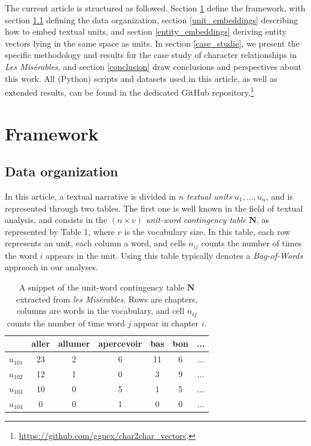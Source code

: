 \documentclass[
twocolumn,
]{ceurart}
\begin{document}
The current article is structured as followed. Section \ref{methodology} define the framework, with section \ref{data} defining the data organization, section  \ref{unit_embeddings} describing how to embed textual units, and section \ref{entity_embeddings} deriving entity vectors lying in the same space as units. In section \ref{case_studie}, we present the specific methodology and results for the case study of character relationships in \emph{Les Misérables}, and section \ref{conclusion} draw conclusions and perspectives about this work. All (Python) scripts and datasets used in this article, as well as extended results, can be found in the dedicated GitHub repository.\footnote{\url{https://github.com/gguex/char2char_vectors}.}

\section{Framework}
\label{methodology}

\subsection{Data organization}
\label{data}

In this article, a textual narrative is divided in $n$ \emph{textual units} $u_1, \ldots, u_n$, and is represented through two tables. The first one is well known in the field of textual analysis, and consists in the $(n \times v)$ \emph{unit-word contingency table} $\mathbf{N}$, as represented by Table 1, where $v$ is the vocabulary size. In this table, each row represents an unit, each column a word, and cells $n_{ij}$ counts the number of times the word $i$ appears in the unit. Using this table typically denotes a \emph{Bag-of-Words} approach in our analyses.

\begin{table}[h]
	\scriptsize
	\begin{tabular}{|c||c|c|c|c|c|c|}
		\hline
		& aller & allumer & apercevoir & bas & bon & ... \\
		\hline
		\hline 
		$u_{101}$ & 23 & 2 & 6 & 11 & 6 & ... \\
		\hline
		$u_{102}$ & 12 & 1 & 0 & 3 & 9 & ... \\
		\hline
		$u_{103}$ & 10 & 0 & 5 & 1 & 5 & ... \\
		\hline
		$u_{104}$ & 0 & 0 & 1 & 0 & 0 & ... \\
		\hline
	\end{tabular}
	\label{cont_table}
	\caption{A snippet of the unit-word contingency table $\mathbf{N}$ extracted from \emph{les Misérables}. Rows are chapters, columns are words in the vocabulary, and cell $n_{ij}$ counts the number of time word $j$ appear in chapter $i$.}
\end{table}
\end{document}
